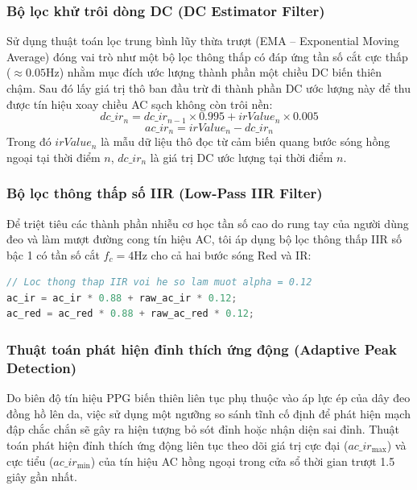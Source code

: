 \subsubsection{Bộ lọc khử trôi dòng DC (DC Estimator Filter)}
Sử dụng thuật toán lọc trung bình lũy thừa trượt (EMA -- Exponential Moving Average) đóng vai trò như một bộ lọc thông thấp có đáp ứng tần số cắt cực thấp ($\approx 0.05\text{Hz}$) nhằm mục đích ước lượng thành phần một chiều DC biến thiên chậm. Sau đó lấy giá trị thô ban đầu trừ đi thành phần DC ước lượng này để thu được tín hiệu xoay chiều AC sạch không còn trôi nền:
\begin{equation}
    dc\_ir_{n} = dc\_ir_{n-1} \times 0.995 + irValue_{n} \times 0.005
\end{equation}
\begin{equation}
    ac\_ir_{n} = irValue_{n} - dc\_ir_{n}
\end{equation}
Trong đó $irValue_{n}$ là mẫu dữ liệu thô đọc từ cảm biến quang bước sóng hồng ngoại tại thời điểm $n$, $dc\_ir_{n}$ là giá trị DC ước lượng tại thời điểm $n$.

\subsubsection{Bộ lọc thông thấp số IIR (Low-Pass IIR Filter)}
Để triệt tiêu các thành phần nhiễu cơ học tần số cao do rung tay của người dùng đeo và làm mượt đường cong tín hiệu AC, tôi áp dụng bộ lọc thông thấp IIR số bậc 1 có tần số cắt $f_c = 4\text{Hz}$ cho cả hai bước sóng Red và IR:
\begin{lstlisting}[language=C++]
// Loc thong thap IIR voi he so lam muot alpha = 0.12
ac_ir = ac_ir * 0.88 + raw_ac_ir * 0.12;
ac_red = ac_red * 0.88 + raw_ac_red * 0.12;
\end{lstlisting}

\subsubsection{Thuật toán phát hiện đỉnh thích ứng động (Adaptive Peak Detection)}
Do biên độ tín hiệu PPG biến thiên liên tục phụ thuộc vào áp lực ép của dây đeo đồng hồ lên da, việc sử dụng một ngưỡng so sánh tĩnh cố định để phát hiện mạch đập chắc chắn sẽ gây ra hiện tượng bỏ sót đỉnh hoặc nhận diện sai đỉnh. Thuật toán phát hiện đỉnh thích ứng động liên tục theo dõi giá trị cực đại ($ac\_ir_{\text{max}}$) và cực tiểu ($ac\_ir_{\text{min}}$) của tín hiệu AC hồng ngoại trong cửa sổ thời gian trượt 1.5 giây gần nhất.


